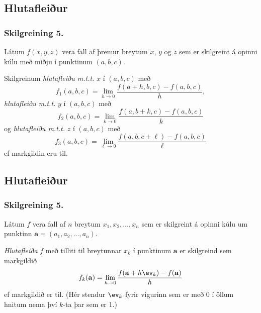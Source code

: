 \newpage
\subsection{Hlutafleiður}
\subsubsection{Skilgreining 5.}
  
Látum $f(x,y,z)$ vera fall af þremur breytum $x$, $y$ og $z$ sem er skilgreint á opinni kúlu með miðju í punktinum $(a, b,c)$. 

\medskip

Skilgreinum \emph{hlutafleiðu m.t.t.} $x$ í $(a,b,c)$ með
$$f_1(a,b,c)=\lim_{h\rightarrow 0}\frac{f(a+h,b,c)-f(a,b,c)}{h},$$
 \emph{hlutafleiðu m.t.t.} $y$ í $(a,b,c)$ með
$$f_2(a,b,c)=\lim_{k\rightarrow 0}\frac{f(a,b+k,c)-f(a,b,c)}{k}$$
og  \emph{hlutafleiðu m.t.t.} $z$ í $(a,b,c)$ með
$$f_3(a,b,c)=\lim_{\ell\rightarrow 0}\frac{f(a,b,c+\ell)-f(a,b,c)}{\ell}$$
ef markgildin eru til.
 






\subsection{Hlutafleiður} 

\subsubsection{Skilgreining 5.}
Látum $f$ vera fall af
$n$ breytum $x_1,x_2,\ldots,x_n$ sem er skilgreint á opinni kúlu um punktinn $\mathbf{a}=(a_1, a_2, \ldots, a_n).$ 

\medskip	
{\em Hlutafleiða} $f$ með
tilliti til breytunnar $x_k$ í punktinum $\mathbf{a}$ er skilgreind sem markgildið 
$$f_k(\mathbf{a})=\lim_{h\rightarrow 0}\frac{f(\mathbf{a}+h\ev_k)-f(\mathbf{a})}{h}$$
ef markgildið er til.  (Hér stendur $\ev_k$ fyrir vigurinn sem er með
0 í öllum hnitum nema því $k$-ta þar sem er 1.)








